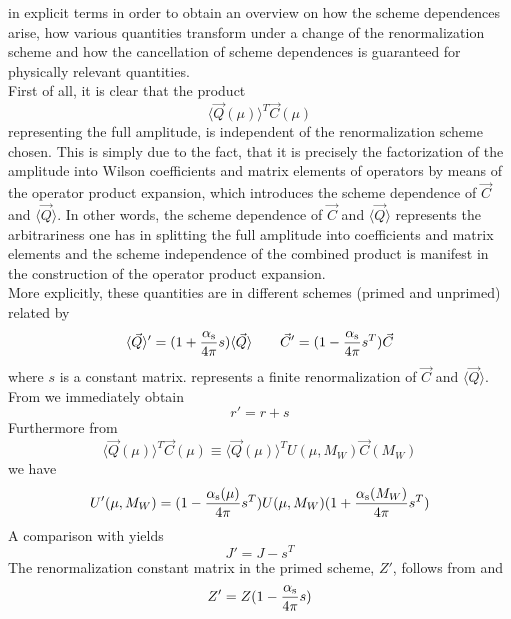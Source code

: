 in explicit terms in order to obtain an overview on how the
scheme dependences arise, how various quantities transform under a
change of the renormalization scheme and how the cancellation of
scheme dependences is guaranteed for physically relevant
quantities.\\
First of all, it is clear that the product
\begin{equation}\label{qtc}
\langle\vec Q(\mu)\rangle^T\vec C(\mu)  \end{equation}
representing the full amplitude, is independent of the
renormalization scheme chosen. This is simply due to the fact, that
it is precisely the factorization of the amplitude into Wilson coefficients
and matrix elements of operators by means of the operator product
expansion, which introduces the scheme dependence of $\vec C$ and
$\langle\vec Q\rangle$. In other words, the scheme dependence of
$\vec C$ and $\langle\vec Q\rangle$ represents the arbitrariness one
has in splitting the full amplitude into coefficients and matrix
elements and the scheme independence of the combined product 
is manifest in the construction of the operator product expansion.
\\
More explicitly, these quantities are in different schemes
(primed and unprimed) related by
\begin{equation}\label{rsqc}\langle\vec Q\rangle'=(1+\frac{\alpha_{\rm s}}{4 \pi} s)\langle\vec Q\rangle\qquad
 \vec C'=(1-\frac{\alpha_{\rm s}}{4 \pi} s^T)\vec C  \end{equation}
 where $s$ is a constant matrix.  represents a finite
renormalization of $\vec C$ and $\langle\vec Q\rangle$.
From  we immediately obtain
\begin{equation}\label{rprs}  r'=r+s  \end{equation}
Furthermore from
\begin{equation}\label{qtuc} \langle\vec Q(\mu)\rangle^T\vec C(\mu)\equiv
  \langle\vec Q(\mu)\rangle^T U(\mu,M_W) \vec C(M_W)  \end{equation}
we have
\begin{equation}\label{upus} U'(\mu,M_W)=
(1-{\alpha_{\rm s}(\mu)\over 4\pi}s^T)U(\mu,M_W)(1+{\alpha_{\rm s}(M_W)\over 4\pi}s^T)  \end{equation}
A comparison with  yields
\begin{equation}\label{jpjs} J'=J-s^T \end{equation}
The renormalization constant matrix in the primed scheme, $Z'$,
follows from  and 
\begin{equation}\label{zpzs}  Z'=Z (1- \frac{\alpha_{\rm s}}{4 \pi} s)  \end{equation}
